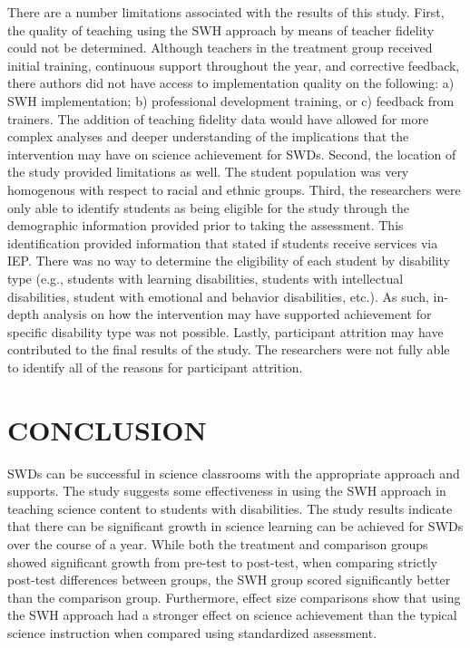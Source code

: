 \documentclass[11.5pt]{sig-alternate} %
\begin{document}
\begin{large}
There are a number limitations associated with the results of this study. First, the quality of teaching using the SWH approach by means of teacher fidelity could not be determined.  Although teachers in the treatment group received initial training, continuous support throughout the year, and corrective feedback, there authors did not have access to implementation quality on the following: a) SWH implementation; b) professional development training, or c) feedback from trainers.  The addition of teaching fidelity data would have allowed for more complex analyses and deeper understanding of the implications that the intervention may have on science achievement for SWDs.  Second, the location of the study provided limitations as well.  The student population was very homogenous with respect to racial and ethnic groups.  Third, the researchers were only able to identify students as being eligible for the study through the demographic information provided prior to taking the assessment.  This identification provided information that stated if students receive services via IEP.  There was no way to determine the eligibility of each student by disability type (e.g., students with learning disabilities, students with intellectual disabilities, student with emotional and behavior disabilities, etc.).  As such, in-depth analysis on how the intervention may have supported achievement for specific disability type was not possible.   Lastly, participant attrition may have contributed to the final results of the study.  The researchers were not fully able to identify all of the reasons for participant attrition.

\section*{CONCLUSION}

SWDs can be successful in science classrooms with the appropriate approach and supports.  The study suggests some effectiveness in using the SWH approach in teaching science content to students with disabilities.  The study results indicate that there can be significant growth in science learning can be achieved for SWDs over the course of a year.  While both the treatment and comparison groups showed significant growth from pre-test to post-test, when comparing strictly post-test differences between groups, the SWH group scored significantly better than the comparison group.  Furthermore, effect size comparisons show that using the SWH approach had a stronger effect on science achievement than the typical science instruction when compared using standardized assessment. 


\end{large}
\end{document}
